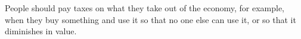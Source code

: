 People should pay taxes on what they take out of the economy, for example, when they buy something and use it so that no one else can use it, or so that it diminishes in value.

